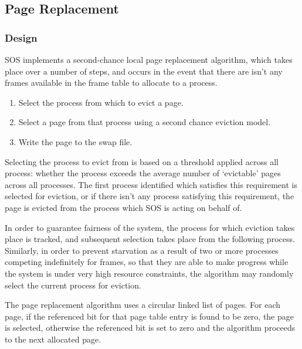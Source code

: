 \documentclass[a4paper,12pt]{article}
\begin{document}

\subsection{Page Replacement}
\subsubsection{Design}
SOS implements a second-chance local page replacement algorithm, which takes
place over a number of steps, and occurs in the event that there are isn't any
frames available in the frame table to allocate to a process.

\begin{enumerate}
\item Select the process from which to evict a page.
\item Select a page from that process using a second chance eviction model.
\item Write the page to the swap file.
\end{enumerate}

Selecting the process to evict from is based on a threshold applied across all
process: whether the process exceeds the average number of `evictable' pages
across all processes.  The first process identified which satisfies this
requirement is selected for eviction, or if there isn't any process satisfying
this requirement, the page is evicted from the process which SOS is acting on
behalf of.

In order to guarantee fairness of the system, the process for which eviction
takes place is tracked, and subsequent selection takes place from the
following process.  Similarly, in order to prevent starvation as a result of
two or more processes competing indefinitely for frames, so that they are able
to make progress while the system is under very high resource constraints, the
algorithm may randomly select the current process for eviction.

The page replacement algorithm uses a circular linked list of pages.  For each
page, if the referenced bit for that page table entry is found to be zero, the
page is selected, otherwise the referenced bit is set to zero and the
algorithm proceeds to the next allocated page.
\end{document}
